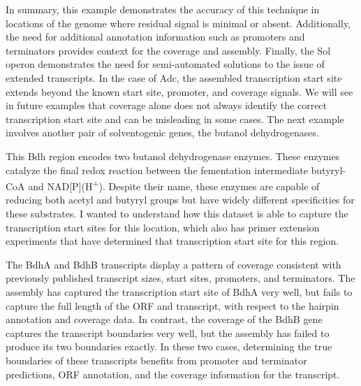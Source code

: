 In summary, this example demonstrates the accuracy of this technique in locations of the genome where residual signal is minimal or absent. Additionally, the need for additional annotation information such as promoters and terminators provides context for the coverage and assembly. Finally, the Sol operon demonstrates the need for semi-automated solutions to the issue of extended transcripts. In the case of Adc, the assembled transcription start site extends beyond the known start site, promoter, and coverage signals. We will see in future examples that coverage alone does not always identify the correct transcription start site and can be misleading in some cases. The next example involves another pair of solventogenic genes, the butanol dehydrogenases.



This Bdh region encodes two butanol dehydrogenase enzymes. These enzymes catalyze the final redox reaction between the fementation intermediate butyryl-CoA and NAD[P](H\textsuperscript{+}). Despite their name, these enzymes are capable of reducing both acetyl and butyryl groups but have widely different specificities for these substrates. I wanted to understand how this dataset is able to capture the transcription start sites for this location, which also has primer extension experiments that have determined that transcription start site for this region.

The BdhA and BdhB transcripts display a pattern of coverage consistent with previously published transcript sizes, start sites, promoters, and terminators. The assembly has captured the transcription start site of BdhA very well, but fails to capture the full length of the ORF and transcript, with respect to the hairpin annotation and coverage data. In contrast, the coverage of the BdhB gene captures the transcript boundaries very well, but the assembly has failed to produce its two boundaries exactly. In these two cases, determining the true boundaries of these transcripts benefits from promoter and terminator predictions, ORF annotation, and the coverage information for the transcript.

